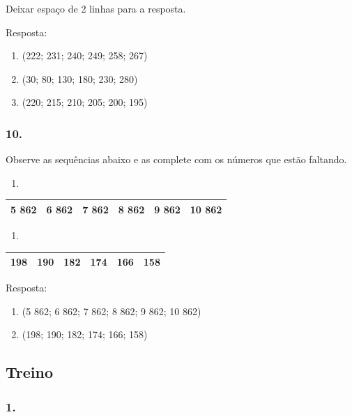 Deixar espaço de 2 linhas para a resposta.

Resposta:

\begin{enumerate}
\def\labelenumi{\alph{enumi})}
\item
  (222; 231; 240; 249; 258; 267)
\item
  (30; 80; 130; 180; 230; 280)
\item
  (220; 215; 210; 205; 200; 195)
\end{enumerate}

\subsubsection{10.}\label{section-35}

Observe as sequências abaixo e as complete com os números que estão
faltando.

\begin{enumerate}
\def\labelenumi{\alph{enumi})}
\item
\end{enumerate}

\begin{longtable}[]{@{}llllll@{}}
\toprule
5 862 & 6 862 & 7 862 & 8 862 & 9 862 & 10 862\tabularnewline
\bottomrule
\end{longtable}

\begin{enumerate}
\def\labelenumi{\alph{enumi})}
\item
\end{enumerate}

\begin{longtable}[]{@{}llllll@{}}
\toprule
198 & 190 & 182 & 174 & 166 & 158\tabularnewline
\bottomrule
\end{longtable}

Resposta:

\begin{enumerate}
\def\labelenumi{\alph{enumi})}
\item
  (5 862; 6 862; 7 862; 8 862; 9 862; 10 862)
\item
  (198; 190; 182; 174; 166; 158)
\end{enumerate}

\subsection{Treino}\label{treino-2}

\subsubsection{1.}\label{section-36}

